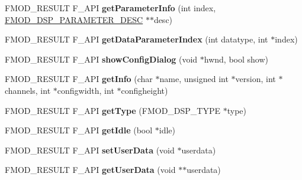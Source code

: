 \begin{DoxyCompactItemize}
\item 
\hypertarget{class_f_m_o_d_1_1_d_s_p_a09d63f638fc2af4dfeed6e2ff03246a5}{F\+M\+O\+D\+\_\+\+R\+E\+S\+U\+L\+T F\+\_\+\+A\+P\+I {\bfseries get\+Parameter\+Info} (int index, \hyperlink{struct_f_m_o_d___d_s_p___p_a_r_a_m_e_t_e_r___d_e_s_c}{F\+M\+O\+D\+\_\+\+D\+S\+P\+\_\+\+P\+A\+R\+A\+M\+E\+T\+E\+R\+\_\+\+D\+E\+S\+C} $\ast$$\ast$desc)}\label{class_f_m_o_d_1_1_d_s_p_a09d63f638fc2af4dfeed6e2ff03246a5}

\item 
\hypertarget{class_f_m_o_d_1_1_d_s_p_a68024a75eddd65053f75a803360ad116}{F\+M\+O\+D\+\_\+\+R\+E\+S\+U\+L\+T F\+\_\+\+A\+P\+I {\bfseries get\+Data\+Parameter\+Index} (int datatype, int $\ast$index)}\label{class_f_m_o_d_1_1_d_s_p_a68024a75eddd65053f75a803360ad116}

\item 
\hypertarget{class_f_m_o_d_1_1_d_s_p_a9a77cb36dbbc0bb053b42eb4d2dcd1f7}{F\+M\+O\+D\+\_\+\+R\+E\+S\+U\+L\+T F\+\_\+\+A\+P\+I {\bfseries show\+Config\+Dialog} (void $\ast$hwnd, bool show)}\label{class_f_m_o_d_1_1_d_s_p_a9a77cb36dbbc0bb053b42eb4d2dcd1f7}

\item 
\hypertarget{class_f_m_o_d_1_1_d_s_p_a5bb61015d7b0e835437e46ea4eaf6442}{F\+M\+O\+D\+\_\+\+R\+E\+S\+U\+L\+T F\+\_\+\+A\+P\+I {\bfseries get\+Info} (char $\ast$name, unsigned int $\ast$version, int $\ast$channels, int $\ast$configwidth, int $\ast$configheight)}\label{class_f_m_o_d_1_1_d_s_p_a5bb61015d7b0e835437e46ea4eaf6442}

\item 
\hypertarget{class_f_m_o_d_1_1_d_s_p_a7241c2669554667f90d4f2a576f64c4a}{F\+M\+O\+D\+\_\+\+R\+E\+S\+U\+L\+T F\+\_\+\+A\+P\+I {\bfseries get\+Type} (F\+M\+O\+D\+\_\+\+D\+S\+P\+\_\+\+T\+Y\+P\+E $\ast$type)}\label{class_f_m_o_d_1_1_d_s_p_a7241c2669554667f90d4f2a576f64c4a}

\item 
\hypertarget{class_f_m_o_d_1_1_d_s_p_aaada6f5f69622219628cefce0185dec2}{F\+M\+O\+D\+\_\+\+R\+E\+S\+U\+L\+T F\+\_\+\+A\+P\+I {\bfseries get\+Idle} (bool $\ast$idle)}\label{class_f_m_o_d_1_1_d_s_p_aaada6f5f69622219628cefce0185dec2}

\item 
\hypertarget{class_f_m_o_d_1_1_d_s_p_a5aacd4725dbe50b725146bd6c412b0f4}{F\+M\+O\+D\+\_\+\+R\+E\+S\+U\+L\+T F\+\_\+\+A\+P\+I {\bfseries set\+User\+Data} (void $\ast$userdata)}\label{class_f_m_o_d_1_1_d_s_p_a5aacd4725dbe50b725146bd6c412b0f4}

\item 
\hypertarget{class_f_m_o_d_1_1_d_s_p_a1b9014166d1ad45923da3227d8db3439}{F\+M\+O\+D\+\_\+\+R\+E\+S\+U\+L\+T F\+\_\+\+A\+P\+I {\bfseries get\+User\+Data} (void $\ast$$\ast$userdata)}\label{class_f_m_o_d_1_1_d_s_p_a1b9014166d1ad45923da3227d8db3439}


\end{DoxyCompactItemize}
